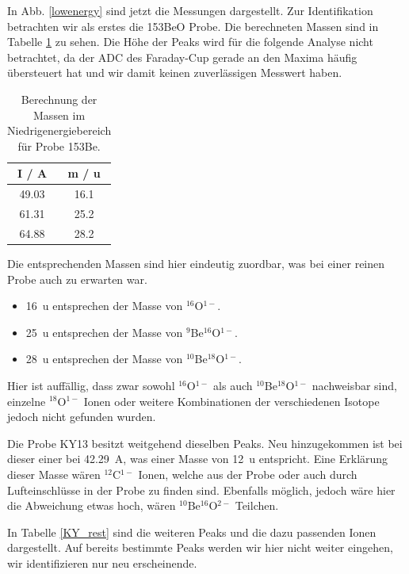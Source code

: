 In Abb. \ref{lowenergy} sind jetzt die Messungen dargestellt.
Zur Identifikation betrachten wir als erstes die 153BeO Probe.
Die berechneten Massen sind in Tabelle \ref{153Be} zu sehen.
Die Höhe der Peaks wird für die folgende Analyse nicht betrachtet, da der ADC des Faraday-Cup gerade an den Maxima häufig übersteuert hat und wir damit keinen zuverlässigen Messwert haben.
\begin{table}[h]
    \centering
    \caption{Berechnung der Massen im Niedrigenergiebereich für Probe 153Be.}
    \begin{tabular}{|c |c|}
        \hline
        I / \si{\ampere} & m / \si{\atomicmassunit} \\
        \hline
        \num{49.03} & \num{16.1} \\
        \num{61.31} & \num{25.2} \\
        \num{64.88} & \num{28.2} \\
        \hline
    \end{tabular}
    \label{153Be}
\end{table}
Die entsprechenden Massen sind hier eindeutig zuordbar, was bei einer reinen Probe auch zu erwarten war.
\begin{itemize}
    \item \SI{16}{\atomicmassunit} entsprechen der Masse von $^{16}$O$^{1-}$.
    \item \SI{25}{\atomicmassunit} entsprechen der Masse von $^{9}$Be$^{16}$O$^{1-}$.
    \item \SI{28}{\atomicmassunit} entsprechen der Masse von $^{10}$Be$^{18}$O$^{1-}$.
\end{itemize}
Hier ist auffällig, dass zwar sowohl $^{16}$O$^{1-}$ als auch $^{10}$Be$^{18}$O$^{1-}$ nachweisbar sind, einzelne $^{18}$O$^{1-}$ Ionen oder  weitere Kombinationen der verschiedenen Isotope jedoch nicht gefunden wurden.

Die Probe KY13 besitzt weitgehend dieselben Peaks.
Neu hinzugekommen ist bei dieser einer bei \SI{42.29}{\ampere}, was einer Masse von \SI{12}{\atomicmassunit} entspricht.
Eine Erklärung dieser Masse wären $^{12}$C$^{1-}$ Ionen, welche aus der Probe oder auch durch Lufteinschlüsse in der Probe zu finden sind.
Ebenfalls möglich, jedoch wäre hier die Abweichung etwas hoch, wären $^{10}$Be$^{16}$O$^{2-}$ Teilchen.

In Tabelle \ref{KY_rest} sind die weiteren Peaks und die dazu passenden Ionen dargestellt.
Auf bereits bestimmte Peaks werden wir hier nicht weiter eingehen, wir identifizieren nur neu erscheinende.

